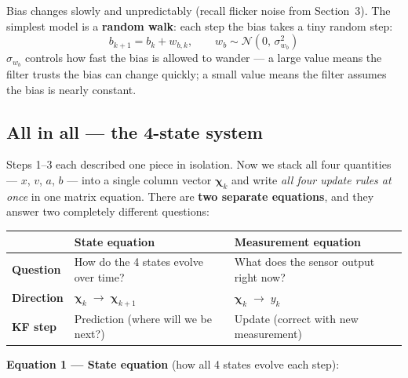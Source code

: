 \documentclass[12pt, a4paper]{article}
\begin{document}
Bias changes slowly and unpredictably (recall flicker noise from
Section~3).
The simplest model is a \textbf{random walk}: each step the bias
takes a tiny random step:
\[
  b_{k+1} = b_k + w_{b,k}, \qquad w_b \sim \mathcal{N}(0,\,\sigma_{w_b}^2)
\]
$\sigma_{w_b}$ controls how fast the bias is allowed to wander ---
a large value means the filter trusts the bias can change quickly;
a small value means the filter assumes the bias is nearly constant.

\subsection*{All in all --- the 4-state system}

Steps 1--3 each described one piece in isolation.
Now we stack all four quantities --- $x$, $v$, $a$, $b$ --- into a
single column vector $\boldsymbol{\chi}_k$ and write \emph{all four
update rules at once} in one matrix equation.
There are \textbf{two separate equations}, and they answer two
completely different questions:

\begin{center}
\renewcommand{\arraystretch}{1.5}
\begin{tabular}{p{3.5cm} p{5cm} p{5cm}}
  \toprule
  & \textbf{State equation} & \textbf{Measurement equation} \\
  \midrule
  \textbf{Question} &
    How do the 4 states evolve over time? &
    What does the sensor output right now? \\
  \textbf{Direction} &
    $\boldsymbol{\chi}_k \;\to\; \boldsymbol{\chi}_{k+1}$ &
    $\boldsymbol{\chi}_k \;\to\; y_k$ \\
  \textbf{KF step} &
    Prediction (where will we be next?) &
    Update (correct with new measurement) \\
  \bottomrule
\end{tabular}
\end{center}

\textbf{Equation 1 --- State equation} (how all 4 states evolve each step):
\end{document}

